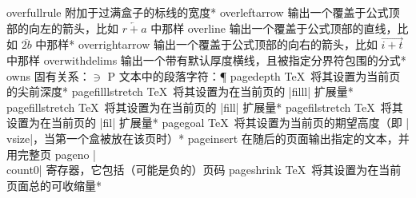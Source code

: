 \capcs overfullrule {附加于过满盒子的标线的宽度}*{}
\capcs overleftarrow {输出一个覆盖于公式顶部的向左的箭头，比如 $\overleftarrow{r+a}$ 中那样}{}{}
\capcs overline {输出一个覆盖于公式顶部的直线，比如 $\overline{2b}$ 中那样}*{}
\capcs overrightarrow {输出一个覆盖于公式顶部的向右的箭头，比如 $\overrightarrow{i+t}$ 中那样}{}{}
\capcs overwithdelims {输出一个带有默认厚度横线，且被指定分界符包围的分式}*{}
\capcs owns {固有关系：$\owns$}{}{}
\capcs P {文本中的段落字符：\P}{}{}
\capcs pagedepth {\TeX\ 将其设置为当前页的尖前深度}*{}
\capcs pagefilllstretch {\TeX\ 将其设置为在当前页的 |filll| 扩展量}*{}
\capcs pagefillstretch {\TeX\ 将其设置为在当前页的 |fill| 扩展量}*{}
\capcs pagefilstretch {\TeX\ 将其设置为在当前页的 |fil| 扩展量}*{}
\capcs pagegoal {\TeX\ 将其设置为当前页的期望高度（即 |\\vsize|，当第一个盒被放在该页时）}*{}
\capcs pageinsert {在随后的页面输出指定的文本，并用完整页}{}{}
\capcs pageno {|\\count0| 寄存器，它包括（可能是负的）页码}{}{}
\capcs pageshrink {\TeX\ 将其设置为在当前页面总的可收缩量}*{}
